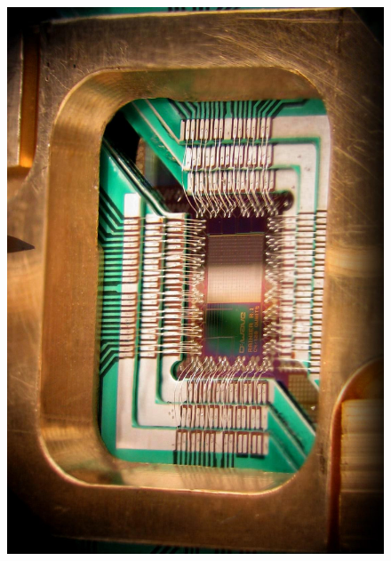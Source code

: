 \documentclass[aspectratio=169]{beamer}
\begin{document}
\begin{frame}
\begin{columns}
    \begin{column}{0.25\textwidth}
      \begin{figure}
        \includegraphics[width=\textwidth]{figures/devices/quantum_computer.jpg}
      \end{figure}
    \end{column}
  \end{columns}
\end{frame}
\end{document}
